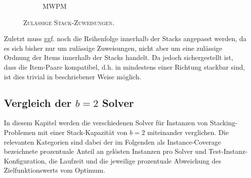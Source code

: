 \begin{figure}[H]
\begin{subfigure}[b]{0.45\textwidth}
  \caption{\textsc{MWPM}}
  \label{fig:mwpm_b=2}
\end{subfigure}
\caption{}
\end{figure}

\begin{figure}[H]
  \centering
    \caption{\textsc{Zulässige Stack-Zuweisungen.}}
    \label{fig:stacking_solution}
\end{figure}

Zuletzt muss ggf. noch die Reihenfolge innerhalb der Stacks angepasst werden, da es sich bisher nur um zulässige Zuweisungen,
nicht aber um eine zulässige Ordnung der Items innerhalb der Stacks handelt.
Da jedoch sichergestellt ist, dass die Item-Paare kompatibel, d.h. in mindestens einer Richtung stackbar sind,
ist dies trivial in beschriebener Weise möglich.

\subsection{Vergleich der $b = 2$ Solver}
\label{sec:solver_comp_b=2}

In diesem Kapitel werden die verschiedenen Solver für Instanzen von Stacking-Problemen mit einer Stack-Kapazität von $b=2$ miteinander verglichen. Die relevanten Kategorien sind dabei der im Folgenden als Instance-Coverage bezeichnete prozentuale Anteil an gelösten Instanzen pro Solver und Test-Instanz-Konfiguration, die Laufzeit und die jeweilige prozentuale Abweichung des Zielfunktionswerts vom Optimum.

